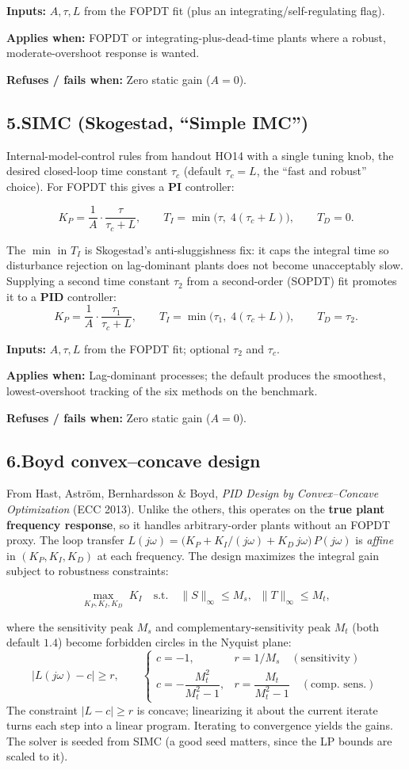 \documentclass[11pt]{article}
\newcommand{\keybox}[1]{%
  \par\vspace{0.4em}%
  \noindent\colorbox{boxbg}{%
    \begin{minipage}{\dimexpr\linewidth-2\fboxsep\relax}%
      \vspace{0.3em}#1\vspace{0.3em}%
    \end{minipage}}%
  \par\vspace{0.4em}%
}
\newcommand{\applies}[1]{\smallskip\noindent\textbf{Applies when:} #1\par}
\newcommand{\refuses}[1]{\noindent\textbf{Refuses / fails when:} #1\par}
\newcommand{\inputs}[1]{\noindent\textbf{Inputs:} #1\par}
\begin{document}
\inputs{$A,\tau,L$ from the FOPDT fit (plus an integrating/self-regulating
flag).}
\applies{FOPDT or integrating-plus-dead-time plants where a robust,
moderate-overshoot response is wanted.}
\refuses{Zero static gain ($A = 0$).}

\subsection{5.\quad SIMC (Skogestad, ``Simple IMC'')}

Internal-model-control rules from handout HO14 with a single tuning knob, the
desired closed-loop time constant $\tau_c$ (default $\tau_c = L$, the
``fast and robust'' choice). For FOPDT this gives a \textbf{PI} controller:
\keybox{\[
  K_P = \frac{1}{A}\cdot\frac{\tau}{\tau_c + L}, \qquad
  T_I = \min\bigl(\tau,\; 4(\tau_c + L)\bigr), \qquad
  T_D = 0 .
\]}
The $\min$ in $T_I$ is Skogestad's anti-sluggishness fix: it caps the integral
time so disturbance rejection on lag-dominant plants does not become
unacceptably slow. Supplying a second time constant $\tau_2$ from a
second-order (SOPDT) fit promotes it to a \textbf{PID} controller:
\[
  K_P = \frac{1}{A}\cdot\frac{\tau_1}{\tau_c + L}, \qquad
  T_I = \min\bigl(\tau_1,\; 4(\tau_c+L)\bigr), \qquad
  T_D = \tau_2 .
\]

\inputs{$A,\tau,L$ from the FOPDT fit; optional $\tau_2$ and $\tau_c$.}
\applies{Lag-dominant processes; the default produces the smoothest,
lowest-overshoot tracking of the six methods on the benchmark.}
\refuses{Zero static gain ($A = 0$).}

\subsection{6.\quad Boyd convex--concave design}

From Hast, Aström, Bernhardsson \& Boyd, \emph{PID Design by Convex--Concave
Optimization} (ECC 2013). Unlike the others, this operates on the
\textbf{true plant frequency response}, so it handles arbitrary-order plants
without an FOPDT proxy. The loop transfer
$L(j\omega) = \bigl(K_P + K_I/(j\omega) + K_D\, j\omega\bigr)\,P(j\omega)$ is
\emph{affine} in $(K_P,K_I,K_D)$ at each frequency. The design maximizes the
integral gain subject to robustness constraints:
\keybox{\[
  \max_{K_P,K_I,K_D}\; K_I
  \quad\text{s.t.}\quad
  \lVert S\rVert_\infty \le M_s, \;\;
  \lVert T\rVert_\infty \le M_t ,
\]}
where the sensitivity peak $M_s$ and complementary-sensitivity peak $M_t$
(both default $1.4$) become forbidden circles in the Nyquist plane:
\[
  \lvert L(j\omega) - c\rvert \ge r, \qquad
  \begin{cases}
    c = -1, & r = 1/M_s \quad(\text{sensitivity})\\[4pt]
    c = -\dfrac{M_t^2}{M_t^2-1}, & r = \dfrac{M_t}{M_t^2-1}\quad(\text{comp. sens.})
  \end{cases}
\]
The constraint $\lvert L - c\rvert \ge r$ is concave; linearizing it about the
current iterate turns each step into a linear program. Iterating to
convergence yields the gains. The solver is seeded from SIMC (a good seed
matters, since the LP bounds are scaled to it).
\end{document}
